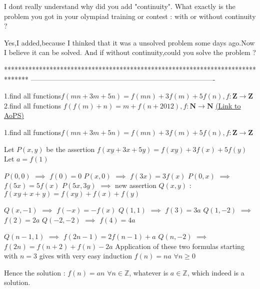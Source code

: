 \begin{solution}
	\begin{tcolorbox}
I dont really understand why did you add "continuity". What exactly is the problem you got in your olympiad training or contest : with or without continuity ?
\end{tcolorbox}
Yes,I added,because I thinked that it was a unsolved problem some days ago.Now I believe  it can be solved.
And if without continuity,could you solve the problem ?
\end{solution}
*******************************************************************************
-------------------------------------------------------------------------------

\begin{problem}
	1.find all functions$f(mn+3m+5n)=f(mn)+3f(m)+5f(n),f:\mathbf{Z}\rightarrow \mathbf{Z}$
2.find all functions $ f(f(m)+n)=m+f(n+2012),f:\mathbf{N}\rightarrow \mathbf{N}$
	\flushright \href{https://artofproblemsolving.com/community/c6h532620}{(Link to AoPS)}
\end{problem}



\begin{solution}
	\begin{tcolorbox}1.find all functions$f(mn+3m+5n)=f(mn)+3f(m)+5f(n),f:\mathbf{Z}\rightarrow \mathbf{Z}$\end{tcolorbox}
Let $P(x,y)$ be the assertion $f(xy+3x+5y)=f(xy)+3f(x)+5f(y)$
Let $a=f(1)$

$P(0,0)$ $\implies$ $f(0)=0$
$P(x,0)$ $\implies$ $f(3x)=3f(x)$
$P(0,x)$ $\implies$ $f(5x)=5f(x)$
$P(5x,3y)$ $\implies$ new assertion $Q(x,y)$ : $f(xy+x+y)=f(xy)+f(x)+f(y)$

$Q(x,-1)$ $\implies$ $f(-x)=-f(x)$
$Q(1,1)$ $\implies$ $f(3)=3a$
$Q(1,-2)$ $\implies$ $f(2)=2a$
$Q(-2,-2)$ $\implies$ $f(4)=4a$

$Q(n-1,1)$ $\implies$ $f(2n-1)=2f(n-1)+a$
$Q(n,-2)$ $\implies$ $f(2n)=f(n+2)+f(n)-2a$
Application of these two formulas starting with $n=3$ gives with very easy induction $f(n)=na$ $\forall n\ge 0$

Hence the solution : $\boxed{f(n)=an}$ $\forall n\in\mathbb Z$, whatever is $a\in\mathbb Z$, which indeed is a solution.
\end{solution}



